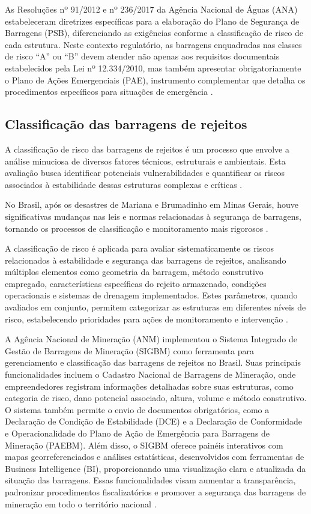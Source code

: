 As Resoluções nº 91/2012 e nº 236/2017 da Agência Nacional de Águas (ANA) estabeleceram diretrizes específicas para a elaboração do Plano de Segurança de Barragens (PSB), diferenciando as exigências conforme a classificação de risco de cada estrutura. Neste contexto regulatório, as barragens enquadradas nas classes de risco ``A'' ou ``B'' devem atender não apenas aos requisitos documentais estabelecidos pela Lei nº 12.334/2010, mas também apresentar obrigatoriamente o Plano de Ações Emergenciais (PAE), instrumento complementar que detalha os procedimentos específicos para situações de emergência \cite{moecke2019}.

\subsection{Classificação das barragens de rejeitos}

A classificação de risco das barragens de rejeitos é um processo que envolve a análise minuciosa de diversos fatores técnicos, estruturais e ambientais. Esta avaliação busca identificar potenciais vulnerabilidades e quantificar os riscos associados à estabilidade dessas estruturas complexas e críticas \cite{cruz2024}.

No Brasil, após os desastres de Mariana e Brumadinho em Minas Gerais, houve significativas mudanças nas leis e normas relacionadas à segurança de barragens, tornando os processos de classificação e monitoramento mais rigorosos \cite{geoscan2020}.

A classificação de risco é aplicada para avaliar sistematicamente os riscos relacionados à estabilidade e segurança das barragens de rejeitos, analisando múltiplos elementos como geometria da barragem, método construtivo empregado, características específicas do rejeito armazenado, condições operacionais e sistemas de drenagem implementados. Estes parâmetros, quando avaliados em conjunto, permitem categorizar as estruturas em diferentes níveis de risco, estabelecendo prioridades para ações de monitoramento e intervenção \cite{cruz2024}.

A Agência Nacional de Mineração (ANM) implementou o Sistema Integrado de Gestão de Barragens de Mineração (SIGBM) como ferramenta para gerenciamento e classificação das barragens de rejeitos no Brasil. Suas principais funcionalidades incluem o Cadastro Nacional de Barragens de Mineração, onde empreendedores registram informações detalhadas sobre suas estruturas, como categoria de risco, dano potencial associado, altura, volume e método construtivo. O sistema também permite o envio de documentos obrigatórios, como a Declaração de Condição de Estabilidade (DCE) e a Declaração de Conformidade e Operacionalidade do Plano de Ação de Emergência para Barragens de Mineração (PAEBM). Além disso, o SIGBM oferece painéis interativos com mapas georreferenciados e análises estatísticas, desenvolvidos com ferramentas de Business Intelligence (BI), proporcionando uma visualização clara e atualizada da situação das barragens. Essas funcionalidades visam aumentar a transparência, padronizar procedimentos fiscalizatórios e promover a segurança das barragens de mineração em todo o território nacional \cite{anmsistema2020}.

